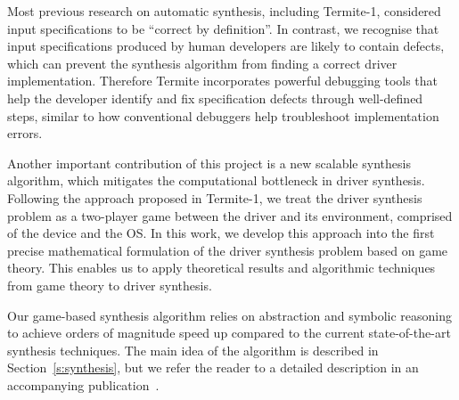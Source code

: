 \documentclass[a4paper,twoside,openright,11pt]{book}
\newcommand{\termite}{Termite\xspace}
\theoremstyle{definition}
\begin{document}
Most previous research on automatic synthesis, including Termite-1, considered input specifications to be ``correct by definition''.  In contrast, we recognise that input specifications produced by human developers are likely to contain defects, which can prevent the synthesis algorithm from finding a correct driver implementation.  Therefore \termite incorporates powerful debugging tools that help the developer identify and fix specification defects through well-defined steps, similar to how conventional debuggers help troubleshoot implementation errors.

Another important contribution of this project is a new scalable synthesis algorithm, which mitigates the computational bottleneck in driver synthesis.  Following the approach proposed in Termite-1, we treat the driver synthesis problem as a two-player game between the driver and its environment, comprised of the device and the OS.  In this work, we develop this approach into the first precise mathematical formulation of the driver synthesis problem based on game theory.  This enables us to apply theoretical results and algorithmic techniques from game theory to driver synthesis.  

Our game-based synthesis algorithm relies on abstraction and symbolic reasoning to achieve orders of magnitude speed up compared to the current state-of-the-art synthesis techniques.  The main idea of the algorithm is described in Section~\ref{s:synthesis}, but we refer the reader to a detailed description in an accompanying publication~\cite{Walker_Ryzhyk_14}. 


       
\end{document}
